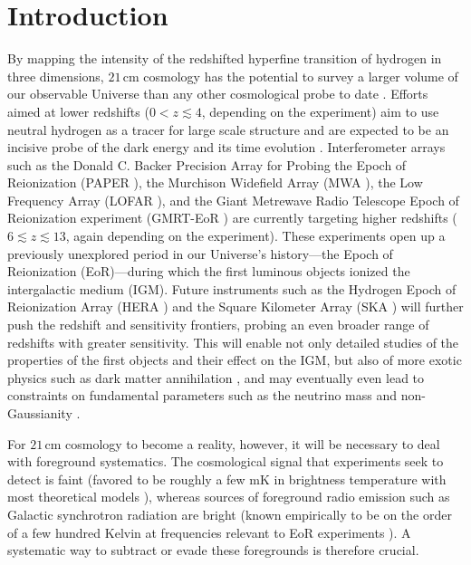 \documentclass[twocolumn,aps,prd,nofootinbib,showpacs]{revtex4-1}
\begin{document}
\maketitle
\section{Introduction}

By mapping the intensity of the redshifted hyperfine transition of hydrogen in three dimensions, $21\,\textrm{cm}$ cosmology has the potential to survey a larger volume of our observable Universe than any other cosmological probe to date \cite{Furlanetto2006,Morales2010,Pritchard2012,AviBook}.  Efforts aimed at lower redshifts ($0 <  z \lesssim 4$, depending on the experiment) aim to use neutral hydrogen as a tracer for large scale structure and are expected to be an incisive probe of the dark energy and its time evolution \cite{Pober2013a,Ansari2012,Battye2012,Shaw2014a,SaiyadAli2013,Chen2012}.  Interferometer arrays such as the Donald C. Backer Precision Array for Probing the Epoch of Reionization (PAPER \cite{Parsons2010,Parsons2013}), the Murchison Widefield Array (MWA \cite{Tingay2013,Bowman2013}), the Low Frequency Array (LOFAR \cite{Yatawatta2013}), and the Giant Metrewave Radio Telescope Epoch of Reionization experiment (GMRT-EoR \cite{Paciga2013}) are currently targeting higher redshifts ($6 \lesssim z \lesssim 13$, again depending on the experiment).  These experiments open up a previously unexplored period in our Universe's history---the Epoch of Reionization (EoR)---during which the first luminous objects ionized the intergalactic medium (IGM).  Future instruments such as the Hydrogen Epoch of Reionization Array (HERA \cite{Pober2014}) and the Square Kilometer Array (SKA \cite{Mellema2013}) will further push the redshift and sensitivity frontiers, probing an even broader range of redshifts with greater sensitivity.  This will enable not only detailed studies of the properties of the first objects and their effect on the IGM, but also of more exotic physics such as dark matter annihilation \cite{Valdes2013}, and may eventually even lead to constraints on fundamental parameters such as the neutrino mass \cite{McQuinn2006,Mao2008} and non-Gaussianity \cite{Mao2013}.

For $21\,\textrm{cm}$ cosmology to become a reality, however, it will be necessary to deal with foreground systematics.  The cosmological signal that experiments seek to detect is faint (favored to be roughly a few mK in brightness temperature with most theoretical models \cite{Lidz2007,Barkana2009}), whereas sources of foreground radio emission such as Galactic synchrotron radiation are bright (known empirically to be on the order of a few hundred Kelvin at frequencies relevant to EoR experiments \cite{deOliveiraCosta2008}).  A systematic way to subtract or evade these foregrounds is therefore crucial.
\end{document}
